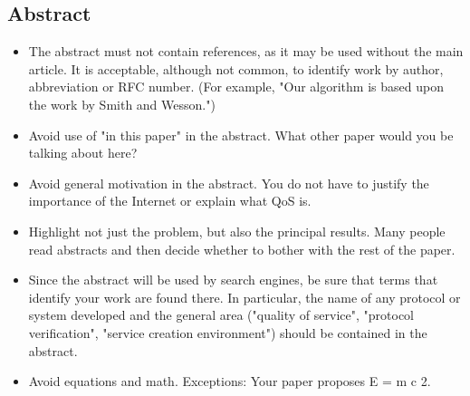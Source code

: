 \subsection*{Abstract}
\begin{itemize}
    \color{red}
    \item The abstract must not contain references, as it may be used without the main article. It is acceptable, although not common, to identify work by author, abbreviation or RFC number. (For example, "Our algorithm is based upon the work by Smith and Wesson.")
    \item Avoid use of "in this paper" in the abstract. What other paper would you be talking about here?
    \item Avoid general motivation in the abstract. You do not have to justify the importance of the Internet or explain what QoS is.
    \item Highlight not just the problem, but also the principal results. Many people read abstracts and then decide whether to bother with the rest of the paper.
    \item Since the abstract will be used by search engines, be sure that terms that identify your work are found there. In particular, the name of any protocol or system developed and the general area ("quality of service", "protocol verification", "service creation environment") should be contained in the abstract.
    \item Avoid equations and math. Exceptions: Your paper proposes E = m c 2.
\end{itemize}


